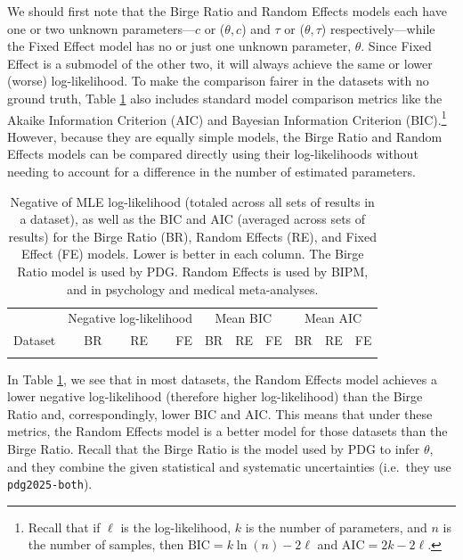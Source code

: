 \documentclass[letterpaper,12pt]{article}
\begin{document}
We should first note that the Birge Ratio and Random Effects models each have one or two unknown parameters---$c$ or ($\theta,c$) and $\tau$ or ($\theta,\tau$) respectively---while the Fixed Effect model has no or just one unknown parameter, $\theta$. Since Fixed Effect is a submodel of the other two, it will always achieve the same or lower (worse) log-likelihood. To make the comparison fairer in the datasets with no ground truth, Table \ref{tab:noground-loglike} also includes standard model comparison metrics like the Akaike Information Criterion (AIC) and Bayesian Information Criterion (BIC).\footnote{Recall that if $\ell$ is the log-likelihood, $k$ is the number of parameters, and $n$ is the number of samples, then $\mathrm{BIC}=k\ln(n)-2\ell$ and $\mathrm{AIC}=2k-2\ell$.} However, because they are equally simple models, the Birge Ratio and Random Effects models can be compared directly using their log-likelihoods without needing to account for a difference in the number of estimated parameters.

\begin{table}[htbp]
  \centering
  \caption{Negative of MLE log-likelihood (totaled across all sets of results in a dataset), as well as the BIC and AIC (averaged across sets of results) for the Birge Ratio (BR), Random Effects (RE), and Fixed Effect (FE) models. Lower is better in each column. The Birge Ratio model is used by PDG. Random Effects is used by BIPM, and in psychology and medical meta-analyses.}
  \label{tab:noground-loglike}
  \smaller
  \begin{tabular}{l|rrr|rrr|rrr}
  \hline & \multicolumn{3}{c|}{Negative log-likelihood} & \multicolumn{3}{c|}{Mean BIC} & \multicolumn{3}{c}{Mean AIC} \\
  Dataset & BR & RE & FE & BR & RE & FE & BR & RE & FE\\\hline\\\hline
  \end{tabular}
\end{table}

In Table \ref{tab:noground-loglike}, we see that in most datasets, the Random Effects model achieves a lower negative log-likelihood (therefore higher log-likelihood) than the Birge Ratio and, correspondingly, lower BIC and AIC. This means that under these metrics, the Random Effects model is a better model for those datasets than the Birge Ratio. Recall that the Birge Ratio is the model used by PDG to infer $\theta$, and they combine the given statistical and systematic uncertainties (i.e.~they use \texttt{pdg2025-both}).
\end{document}
